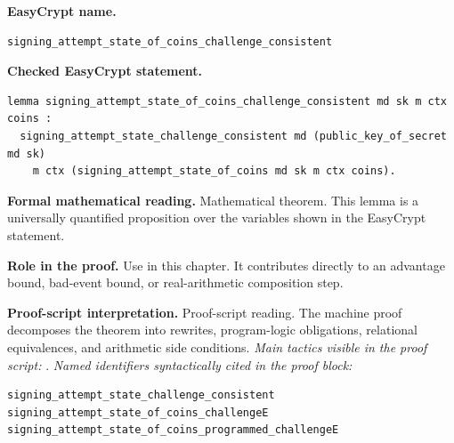 \begin{formaltheorem}
\noindent\textbf{EasyCrypt name.}
\begin{lstlisting}[language=EasyCrypt,basicstyle=\ttfamily\scriptsize]
signing_attempt_state_of_coins_challenge_consistent
\end{lstlisting}
\noindent\textbf{Checked EasyCrypt statement.}
\begin{lstlisting}[language=EasyCrypt,basicstyle=\ttfamily\scriptsize]
lemma signing_attempt_state_of_coins_challenge_consistent md sk m ctx coins :
  signing_attempt_state_challenge_consistent md (public_key_of_secret md sk)
    m ctx (signing_attempt_state_of_coins md sk m ctx coins).
\end{lstlisting}
\noindent\textbf{Formal mathematical reading.}
Mathematical theorem. This lemma is a universally quantified proposition over the variables shown in the EasyCrypt statement.

\noindent\textbf{Role in the proof.}
Use in this chapter. It contributes directly to an advantage bound, bad-event bound, or real-arithmetic composition step.

\noindent\textbf{Proof-script interpretation.}
Proof-script reading. The machine proof decomposes the theorem into rewrites, program-logic obligations, relational equivalences, and arithmetic side conditions.
\emph{Main tactics visible in the proof script:} .
\emph{Named identifiers syntactically cited in the proof block:}
\begin{lstlisting}[language=EasyCrypt,basicstyle=\ttfamily\scriptsize]
signing_attempt_state_challenge_consistent
signing_attempt_state_of_coins_challengeE
signing_attempt_state_of_coins_programmed_challengeE
\end{lstlisting}

\end{formaltheorem}

